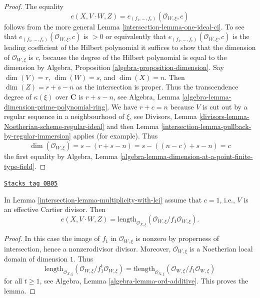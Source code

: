 \begin{proof}

The equality
$$
e(X, V\cdot W, Z) = e_{(f_1, \ldots, f_c)}(\mathcal{O}_{W, \xi}, c)
$$
follows from the more general Lemma \ref{intersection-lemma-one-ideal-ci}.
To see that $e_{(f_1, \ldots, f_c)}(\mathcal{O}_{W, \xi}, c)$ is
$> 0$ or equivalently that $e_{(f_1, \ldots, f_c)}(\mathcal{O}_{W, \xi}, c)$
is the leading coefficient of the Hilbert polynomial
it suffices to show that the
dimension of $\mathcal{O}_{W, \xi}$ is $c$, because the degree of the
Hilbert polynomial is equal to the dimension by
Algebra, Proposition \ref{algebra-proposition-dimension}.
Say $\dim(V) = r$, $\dim(W) = s$, and $\dim(X) = n$. Then
$\dim(Z) = r + s - n$ as the intersection is proper. Thus
the transcendence degree of $\kappa(\xi)$ over $\mathbf{C}$ is
$r + s - n$, see Algebra, Lemma
\ref{algebra-lemma-dimension-prime-polynomial-ring}.
We have $r + c = n$ because $V$ is cut out by a regular sequence
in a neighbourhood of $\xi$, see
Divisors, Lemma \ref{divisors-lemma-Noetherian-scheme-regular-ideal}
and then Lemma \ref{intersection-lemma-pullback-by-regular-immersion}
applies (for example). Thus
$$
\dim(\mathcal{O}_{W, \xi}) = s - (r + s - n) = s - ((n - c) + s - n) = c
$$
the first equality by Algebra, Lemma
\ref{algebra-lemma-dimension-at-a-point-finite-type-field}.
\end{proof}

\begin{lemma}
\label{intersection-lemma-multiplicity-with-effective-Cartier-divisor}
\href{https://stacks.math.columbia.edu/tag/0B05}{\texttt{Stacks tag 0B05}}

In Lemma \ref{intersection-lemma-multiplicity-with-lci} assume that  $c = 1$, i.e., $V$
is an effective Cartier divisor. Then
$$
e(X, V \cdot W, Z) =
\text{length}_{\mathcal{O}_{X, \xi}}
(\mathcal{O}_{W, \xi}/f_1\mathcal{O}_{W, \xi}).
$$
\end{lemma}

\begin{proof}
In this case the image of $f_1$ in $\mathcal{O}_{W, \xi}$ is nonzero by
properness of intersection, hence a nonzerodivisor divisor. Moreover,
$\mathcal{O}_{W, \xi}$ is a Noetherian local domain of dimension $1$.
Thus
$$
\text{length}_{\mathcal{O}_{X, \xi}}
(\mathcal{O}_{W, \xi}/f_1^t\mathcal{O}_{W, \xi}) =
t \text{length}_{\mathcal{O}_{X, \xi}}
(\mathcal{O}_{W, \xi}/f_1\mathcal{O}_{W, \xi})
$$
for all $t \geq 1$, see Algebra, Lemma \ref{algebra-lemma-ord-additive}.
This proves the lemma.
\end{proof}


